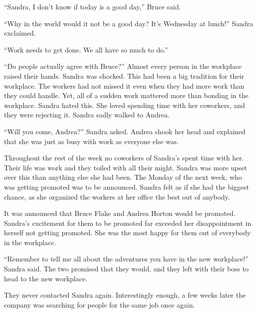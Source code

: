 \documentclass[12pt,letterpaper]{article}
\begin{document}
``Sandra, I don't know if today is a good day,'' Bruce said.

``Why in the world would it not be a good day?
It's Wednesday at lunch!'' Sandra exclaimed.

``Work needs to get done.
We all have so much to do.''

``Do people actually agree with Bruce?''
Almost every person in the workplace raised their hands.
Sandra was shocked.
This had been a big tradition for their workplace.
The workers had not missed it even when they had more work than they could handle.
Yet, all of a sudden work mattered more than bonding in the workplace.
Sandra hated this.
She loved spending time with her coworkers, and they were rejecting it.
Sandra sadly walked to Andrea.

``Will you come, Andrea?''
Sandra asked.
Andrea shook her head and explained that she was just as busy with work as everyone else was.

Throughout the rest of the week no coworkers of Sandra's spent time with her.
Their life was work and they toiled with all their might.
Sandra was more upset over this than anything else she had been.
The Monday of the next week, who was getting promoted was to be announced.
Sandra felt as if she had the biggest chance, as she organized the workers at her office the best out of anybody.

It was announced that Bruce Flake and Andrea Horton would be promoted.
Sandra's excitement for them to be promoted far exceeded her disappointment in herself not getting promoted.
She was the most happy for them out of everybody in the workplace.

``Remember to tell me all about the adventures you have in the new workplace!'' Sandra said.
The two promised that they would, and they left with their boss to head to the new workplace.

They never contacted Sandra again.
Interestingly enough, a few weeks later the company was searching for people for the same job once again.
\end{document}
